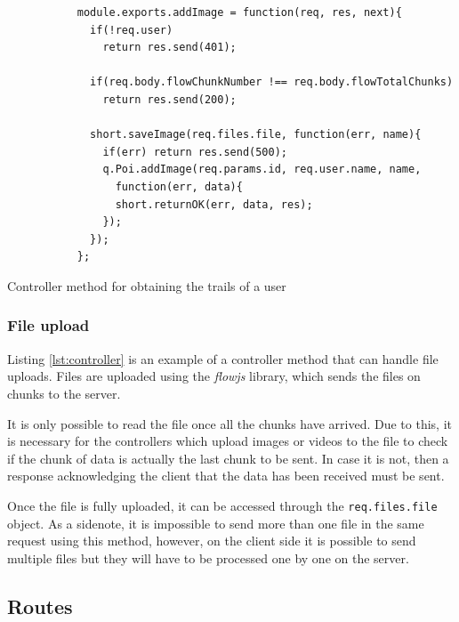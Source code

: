 \begin{listing}[ht]\centering
  \begin{minipage}{.85\textwidth}
    \begin{verbatim}
           module.exports.addImage = function(req, res, next){
             if(!req.user)
               return res.send(401);
             
             if(req.body.flowChunkNumber !== req.body.flowTotalChunks)
               return res.send(200); 
               
             short.saveImage(req.files.file, function(err, name){
               if(err) return res.send(500);
               q.Poi.addImage(req.params.id, req.user.name, name, 
                 function(err, data){
                 short.returnOK(err, data, res);
               });
             });
           };
    \end{verbatim}
  \end{minipage}
  \caption{Controller method for obtaining the trails of a user}\label{lst:controller}
\end{listing}

\subsubsection*{File upload}

Listing \ref{lst:controller} is an example of a controller method that can handle file uploads. Files are uploaded using the \textit{flowjs} \cite{flowjs} library, which sends the files on chunks to the server. 

It is only possible to read the file once all the chunks have arrived. Due to this, it is necessary for the controllers which upload images or videos to the file to check if the chunk of data is actually the last chunk to be sent. In case it is not, then a response acknowledging the client that the data has been received must be sent.

Once the file is fully uploaded, it can be accessed through the \texttt{req.files.file} object. As a sidenote, it is impossible to send more than one file in the same request using this method, however, on the client side it is possible to send multiple files but they will have to be processed one by one on the server.

\subsection{Routes}

